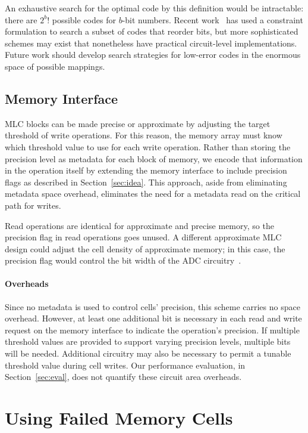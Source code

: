 \documentclass[prodmode,acmtocs]{acmsmall}
\begin{document}
An exhaustive search for the optimal code by this definition would be
intractable: there are $2^b!$ possible codes for $b$-bit numbers.
Recent work~\cite{holcomb-wacas} has used a constraint formulation to search a
subset of codes that reorder bits, but more sophisticated schemes
may exist that nonetheless have practical circuit-level implementations.
Future work should develop search strategies for low-error codes in
the enormous space of possible mappings.


\subsection{Memory Interface}

MLC blocks can be made precise or approximate by adjusting the target threshold of write
operations. For this reason, the memory array must know which threshold value
to use for each write operation. Rather than storing the precision level as
metadata for each block of memory, we encode that information in the operation itself by extending the memory interface to include
precision flags as described in Section~\ref{sec:idea}. This approach, aside
from eliminating metadata space overhead, eliminates the need for a metadata
read on the critical path for writes.

Read operations are identical for approximate and precise memory, so the
precision flag in read operations goes unused. A different approximate MLC
design could adjust the cell density of approximate memory; in this case, the
precision flag would control the bit width of the ADC
circuitry~\cite{morphablepcm}.

\paragraph{Overheads}

Since no metadata is used to control cells' precision, this scheme carries no
space overhead. However, at least one additional bit is necessary in each read
and write request on the memory interface to indicate the operation's
precision. If multiple threshold values are provided to support varying precision
levels, multiple bits will be needed. Additional circuitry may also be
necessary to permit a tunable threshold value during cell writes. Our performance
evaluation, in Section~\ref{sec:eval}, does not quantify these circuit area overheads.

\section{Using Failed Memory Cells}
\label{sec:recycling}
\end{document}
